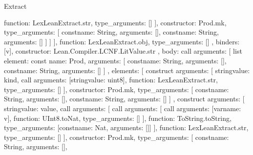 \begin{lexlean}{Extract}
\begin{toolingmodule}
{{{{{{{{                          function: LexLeanExtract.str,
                          type_arguments: []
                        }
                      ],
                      constructor: Prod.mk,
                      type_arguments: [
                        const{name: String, arguments: []},
                        const{name: String, arguments: []}
                      ]
                    }
                  ]
                }
              ],
              function: LexLeanExtract.obj,
              type_arguments: []
            },
            binders: [v],
            constructor: Lean.Compiler.LCNF.LitValue.str
          },
          {
            body: call{
              arguments: [
                list{
                  element: const{
                    name: Prod,
                    arguments: [
                      const{name: String, arguments: []},
                      const{name: String, arguments: []}
                    ]
                  },
                  elements: [
                    construct{
                      arguments: [
                        string{value: kind},
                        call{
                          arguments: [string{value: uint8}],
                          function: LexLeanExtract.str,
                          type_arguments: []
                        }
                      ],
                      constructor: Prod.mk,
                      type_arguments: [
                        const{name: String, arguments: []},
                        const{name: String, arguments: []}
                      ]
                    },
                    construct{
                      arguments: [
                        string{value: value},
                        call{
                          arguments: [
                            call{
                              arguments: [
                                call{
                                  arguments: [var{name: v}],
                                  function: UInt8.toNat,
                                  type_arguments: []
                                }
                              ],
                              function: ToString.toString,
                              type_arguments: [const{name: Nat, arguments: []}]
                            }
                          ],
                          function: LexLeanExtract.str,
                          type_arguments: []
                        }
                      ],
                      constructor: Prod.mk,
                      type_arguments: [
                        const{name: String, arguments: []},
}}}}}}}
\end{toolingmodule}
\end{lexlean}
